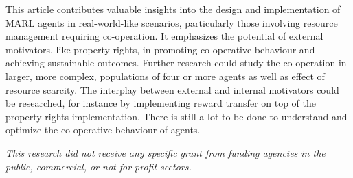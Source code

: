 \documentclass[preprint,12pt,authoryear]{elsarticle}
\begin{document}
This article contributes valuable insights into the design and implementation of MARL agents in real-world-like scenarios, particularly those involving resource management requiring co-operation. It emphasizes the potential of external motivators, like property rights, in promoting co-operative behaviour and achieving sustainable outcomes. Further research could study the co-operation in larger, more complex, populations of four or more agents as well as effect of resource scarcity. 
The interplay between external and internal motivators could be researched, for instance by implementing reward transfer on top of the property rights implementation. There is still a lot to be done to understand and optimize the co-operative behaviour of agents.


\vspace{10pt}

\textit{This research did not receive any specific grant from funding agencies in the public, commercial, or not-for-profit sectors.}

% 


\end{document}
